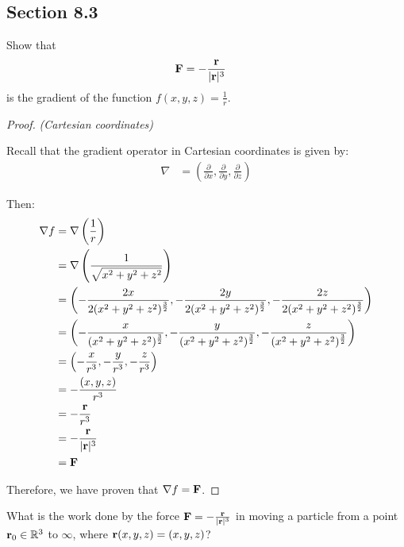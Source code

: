 \subsection{Section 8.3}

\begin{tcolorbox}[
        title={Problem 10 (a)},
        valign=center,
        nobeforeafter,
        colframe=gray!95!black
    ]
    Show that
    \begin{align}
        \vb{F} &= -\frac{\vb{r}}{|\vb{r}|^3}
    \end{align}
    is the gradient of the function \(f(x, y, z) = \frac{1}{r}\).
\end{tcolorbox}

\begin{proof}
\textit{(Cartesian coordinates)}

Recall that the gradient operator in Cartesian coordinates is given by:
\begin{align}
    \nabla &= \left(\frac{\partial}{\partial x}, \frac{\partial}{\partial y}, \frac{\partial}{\partial z}\right)
\end{align}

Then:
\begin{align*}
    \nabla f &= \nabla \left(\frac{1}{r}\right) \\
    &= \nabla \left(\frac{1}{\sqrt{x^2 + y^2 + z^2}}\right) \\
    &= \left(-\frac{2x}{2(x^2 + y^2 + z^2)^{\frac{3}{2}}}, -\frac{2y}{2(x^2 + y^2 + z^2)^{\frac{3}{2}}}, -\frac{2z}{2(x^2 + y^2 + z^2)^{\frac{3}{2}}}\right) \\
    &= \left(-\frac{x}{(x^2 + y^2 + z^2)^{\frac{3}{2}}}, -\frac{y}{(x^2 + y^2 + z^2)^{\frac{3}{2}}}, -\frac{z}{(x^2 + y^2 + z^2)^{\frac{3}{2}}}\right) \\
    &= \left(-\frac{x}{r^3}, -\frac{y}{r^3}, -\frac{z}{r^3}\right) \\
    &= -\frac{\left(x, y, z\right)}{r^{3}} \\
    &= -\frac{\vb{r}}{r^{3}} \\
    &= -\frac{\vb{r}}{|\vb{r}|^{3}} \\
    &=\vb{F}
\end{align*}

Therefore, we have proven that \(\nabla f = \vb{F}\).
\end{proof}

\begin{tcolorbox}[
        title={Problem 10 (b)},
        valign=center,
        nobeforeafter,
        colframe=gray!95!black
    ]
    What is the work done by the force \(\vb{F} = -\frac{\vb{r}}{|\vb{r}|^3}\) in moving a particle from a point \(\vb{r}_0 \in \mathbb{R}^3\) to \(\infty\), where \(\vb{r}(x, y, z) = (x, y, z)\)?
\end{tcolorbox}

